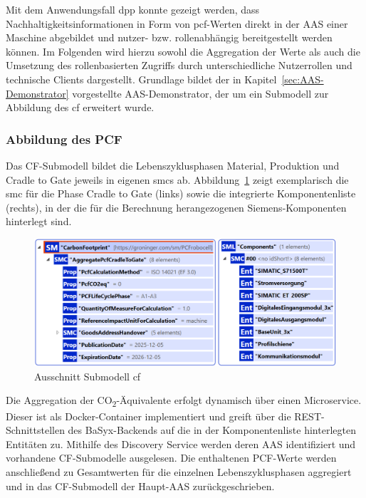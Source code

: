 Mit dem Anwendungsfall \acs{dpp} konnte gezeigt werden, dass Nachhaltigkeitsinformationen in Form von \acs{pcf}-Werten direkt in der AAS einer Maschine abgebildet und nutzer- bzw. rollenabhängig bereitgestellt werden können.
Im Folgenden wird hierzu sowohl die Aggregation der Werte als auch die Umsetzung des rollenbasierten Zugriffs durch unterschiedliche Nutzerrollen und technische Clients dargestellt.
Grundlage bildet der in Kapitel~\ref{sec:AAS-Demonstrator} vorgestellte AAS-Demonstrator, der um ein Submodell zur Abbildung des \acs{cf} erweitert wurde.

\subsubsection{Abbildung des PCF}
Das CF-Submodell bildet die Lebenszyklusphasen Material, Produktion und Cradle to Gate jeweils in eigenen \acsp{smc} ab.
Abbildung~\ref{fig:SubmodellCF} zeigt exemplarisch die \acs{smc} für die Phase Cradle to Gate (links) sowie die integrierte Komponentenliste (rechts), in der die für die Berechnung herangezogenen Siemens-Komponenten hinterlegt sind.

\begin{figure}[htbp]
    \centering
        \includegraphics[width=1\textwidth]{Bilder/ErgebnissePackageExplorer/CarbonFoorprintTest.png}
    \caption{Ausschnitt Submodell \acs{cf}}
    \label{fig:SubmodellCF}
\end{figure}
\vspace{-0.5em}

Die Aggregation der CO\textsubscript{2}-Äquivalente erfolgt dynamisch über einen Microservice. 
Dieser ist als Docker-Container implementiert und greift über die REST-Schnittstellen des BaSyx-Backends auf die in der Komponentenliste hinterlegten Entitäten zu. 
Mithilfe des Discovery Service werden deren AAS identifiziert und vorhandene CF-Submodelle ausgelesen. 
Die enthaltenen PCF-Werte werden anschließend zu Gesamtwerten für die einzelnen Lebenszyklusphasen aggregiert und in das CF-Submodell der Haupt-AAS zurückgeschrieben.

